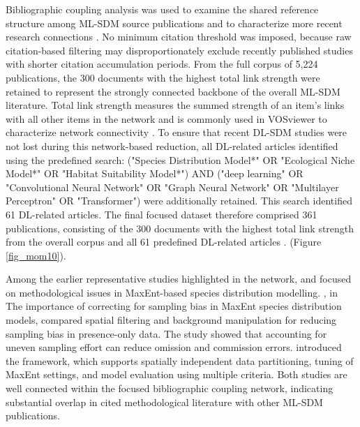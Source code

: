 \documentclass[authoryear,preprint,review,12pt]{elsarticle}
\begin{document}
Bibliographic coupling analysis was used to examine the shared reference structure among ML-SDM source publications and to characterize more recent research connections \citep{zupic2015bibliometric, donthu2021conduct}. No minimum citation threshold was imposed, because raw citation-based filtering may disproportionately exclude recently published studies with shorter citation accumulation periods. From the full corpus of 5,224 publications, the 300 documents with the highest total link strength were retained to represent the strongly connected backbone of the overall ML-SDM literature. Total link strength measures the summed strength of an item’s links with all other items in the network and is commonly used in VOSviewer to characterize network connectivity \citep{boyack2010co}. To ensure that recent DL-SDM studies were not lost during this network-based reduction, all DL-related articles identified using the predefined search: ("Species Distribution Model*" OR "Ecological Niche Model*" OR "Habitat Suitability Model*") AND ("deep learning" OR "Convolutional Neural Network" OR "Graph Neural Network" OR "Multilayer Perceptron" OR "Transformer") were additionally retained. This search identified 61 DL-related articles. The final focused dataset therefore comprised 361 publications, consisting of the 300 documents with the highest total link strength from the overall corpus and all 61 predefined DL-related articles \citep{jarneving2007bibliographic,klavans2011global}. (Figure \ref{fig_mom10}).

Among the earlier representative studies highlighted in the network, \cite{kramer2013importance} and \cite{muscarella2014enm} focused on methodological issues in MaxEnt-based species distribution modelling. \cite{kramer2013importance}, in The importance of correcting for sampling bias in MaxEnt species distribution models, compared spatial filtering and background manipulation for reducing sampling bias in presence-only data. The study showed that accounting for uneven sampling effort can reduce omission and commission errors. \cite{muscarella2014enm} introduced the framework, which supports spatially independent data partitioning, tuning of MaxEnt settings, and model evaluation using multiple criteria. Both studies are well connected within the focused bibliographic coupling network, indicating substantial overlap in cited methodological literature with other ML-SDM publications.
\end{document}
